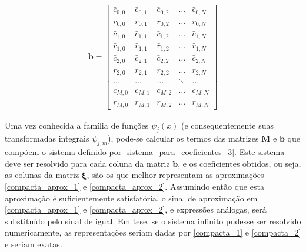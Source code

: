\begin{align}
\mathbf{b}
=
\begin{bmatrix}
\bar{c}_{0, 0} & \bar{c}_{0, 1} &\bar{c}_{0, 2} & \ldots & \bar{c}_{0, N} \\
\bar{r}_{0, 0} & \bar{r}_{0, 1} &\bar{r}_{0, 2} & \ldots & \bar{r}_{0, N} \\
\bar{c}_{1, 0} & \bar{c}_{1, 1} &\bar{c}_{1, 2} & \ldots & \bar{c}_{1, N} \\
\bar{r}_{1, 0} & \bar{r}_{1, 1} &\bar{r}_{1, 2} & \ldots & \bar{r}_{1, N} \\
\bar{c}_{2, 0} & \bar{c}_{2, 1} &\bar{c}_{2, 2} & \ldots & \bar{c}_{2, N} \\
\bar{r}_{2, 0} & \bar{r}_{2, 1} &\bar{r}_{2, 2} & \ldots & \bar{r}_{2, N} \\
\ldots & \ldots & \ldots & \ddots & \ldots \\
\bar{c}_{M, 0} & \bar{c}_{M, 1} &\bar{c}_{M, 2} & \ldots & \bar{c}_{M, N} \\
\bar{r}_{M, 0} & \bar{r}_{M, 1} &\bar{r}_{M, 2} & \ldots & \bar{r}_{M, N}
\end{bmatrix}
\label{sistema_para_coeficientes_3_end}
\end{align}

Uma vez conhecida a família de funções $\psi_j(x)$ (e consequentemente suas transformadas integrais $\bar{\psi}_{j, m}$), pode-se calcular os termos das matrizes $\mathbf{M}$ e $\mathbf{b}$ que compõem o sistema definido por \eqref{sistema_para_coeficientes_3}. Este sistema deve ser resolvido para cada coluna da matriz $\mathbf{b}$, e os coeficientes obtidos, ou seja, as colunas da matriz $\mathbf{\xi}$, são os que melhor representam as aproximações \eqref{compacta_aprox_1} e \eqref{compacta_aprox_2}. Assumindo então que esta aproximação é suficientemente satisfatória, o sinal de aproximação em \eqref{compacta_aprox_1} e \eqref{compacta_aprox_2}, e expressões análogas, será substituído pelo sinal de igual. Em tese, se o sistema infinito pudesse ser resolvido numericamente, as representações seriam dadas por \eqref{compacta_1} e \eqref{compacta_2} e seriam exatas.

